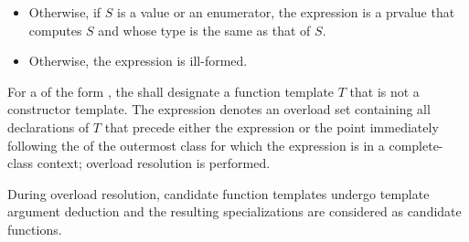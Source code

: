 \begin{itemize}
is a bit-field if and only if $X$ is a bit-field.
If $E$ appears in the predicate of a contract assertion $C$
and $S$ is
\begin{itemize}
\item
a variable declared outside of $C$
of object type ,
\item
a variable declared outside of $C$
of type ``reference to '', or
\item
a structured binding of type 
whose corresponding variable is declared outside of $C$,
\end{itemize}
then the type of $E$ is ,
otherwise $E$ has the same type as that of $S$.
\begin{note}
The type of a 
designating a variable or structured binding of reference type
will be adjusted to a non-reference type.
\end{note}
\item
Otherwise, if $S$ is a value or an enumerator,
the expression is a prvalue that computes $S$ and
whose type is the same as that of $S$.
\item
Otherwise, the expression is ill-formed.
\end{itemize}

\pnum
For a  of
the form ,
the  shall designate a function template $T$
that is not a constructor template.
The expression denotes an overload set containing all declarations of $T$
that precede either the expression or
the point immediately following the  of
the outermost class for which the expression is in a complete-class context;
overload resolution is performed.
\begin{note}
During overload resolution,
candidate function templates undergo template argument deduction and
the resulting specializations are considered as candidate functions.
\end{note}

